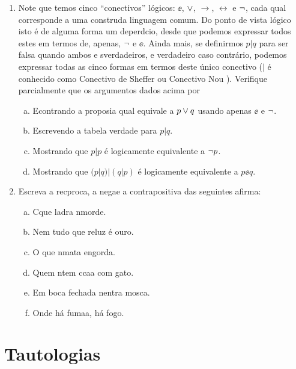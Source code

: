 \begin{enumerate}[{\bf 1.}]
\item Note que temos cinco ``conectivos'' l\'ogicos: $\ee$, $\vee$, $\to$, $\leftrightarrow$ e $\lnot$, cada qual corresponde a uma constru\cao da linguagem comum. Do ponto de vista l\'ogico isto \'e de alguma forma um deperd\ih cio, desde que podemos expressar todos estes em termos de, apenas, $\lnot$ e $\ee$. Ainda mais, se definirmos $p|q$ para ser falsa quando ambos \pp e \qq s\ao verdadeiros, e verdadeiro caso contr\'ario, podemos expressar todas as cinco formas em termos deste \'unico conectivo ($|$ \'e conhecido como Conectivo de Sheffer  ou Conectivo Nou ). Verifique parcialmente que os argumentos dados acima por
\begin{enumerate}[a)]
\item Econtrando a proposi\cao a qual equivale a $p \vee q$ usando apenas $\ee$ e $\lnot$.
\item Escrevendo a tabela verdade para $p|q$.
\item Mostrando que $p|p$ \'e logicamente equivalente a $\lnot p$.
\item Mostrando que $(p|q)|(q|p)$ \'e logicamente equivalente a $p \ee q$.
\end{enumerate}

\item Escreva a rec\ih proca, a nega\cao e a contrapositiva das seguintes afirma\cois:
\begin{enumerate}[a)]
\item C\ao que ladra n\ao morde.
\item Nem tudo que reluz \'e ouro.
\item O que n\ao mata engorda.
\item Quem n\ao tem c\ao ca\cc a com gato.
\item Em boca fechada n\ao entra mosca.
\item Onde h\'a fuma\cc a, h\'a fogo.
\end{enumerate}
\end{enumerate}

\section{Tautologias}\label{tautologias}

